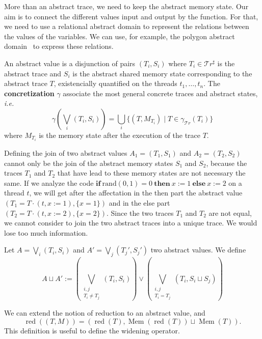 \documentclass[runningheads]{llncs}
\newcommand{\ifinst}{\mathbf{if}}
\newcommand{\theninst}{\mathbf{then}}
\newcommand{\elseinst}{\mathbf{else}}
\newcommand{\Traces}{\mathcal T\!r}
\newcommand{\aTraces}{\mathcal T\!r^\sharp}
\DeclareMathOperator{\red}{red}
\DeclareMathOperator{\Mem}{Mem}
\begin{document}
More than an abstract trace, we need to keep the abstract memory state. Our aim is to connect the different values input and output by the function. For that, we need to use a relational abstract domain to represent the relations between the values of the variables. We can use, for example, the polygon abstract domain~\cite{DBLP:journals/lisp/Mine06} to express these relations. 



\begin{definition}
	An abstract value is a disjunction of pairs $(T_i, S_i)$ where $T_i \in \aTraces$ is the abstract trace and $S_i$ is the abstract shared memory state corresponding to the abstract trace $T$, existencially quantified on the threads $t_1, \dots, t_n$. The \textbf{concretization} $\gamma$ associate the most general concrete traces and abstract states, \emph{i.e.}
	\[\gamma\left(\bigvee_i (T_i, S_i)\right) = \bigcup_i \{ (T, M_{T_i}) \mid T\in\gamma_{\Traces}(T_i) \}\]
	where $M_{T_i}$ is the memory state after the execution of the trace $T$. 
\end{definition}





Defining the join of two abstract values $A_1 = (T_1, S_1)$ and $A_2 = (T_2, S_2)$ cannot only be the join of the abstract memory states $S_1$ and $S_2$, because the traces $T_1$ and $T_2$ that have lead to these memory states are not necessary the same. If we analyze the code $\ifinst\ \mathrm{rand}(0,1) = 0\ \theninst \ x := 1 \ \elseinst \ x :=2$ on a thread $t$, we will get after the affectation in the then part the abstract value $(T_1 = T \cdot (t, x:=1), \{x = 1\})$ and in the else part $(T_2 = T \cdot (t, x:= 2), \{x = 2\})$. Since the two traces $T_1$ and $T_2$ are not equal, we cannot consider to join the two abstract traces into a unique trace. We would lose too much information. 


\begin{definition}[Join]
	Let $A = \bigvee_i (T_i, S_i)$ and $A' = \bigvee_j (T_j', S_j')$ two abstract values. We define
	\[A \sqcup A' := \left(\bigvee_{\substack{i,j\\T_i \neq T_j}} (T_i, S_i) \right) \vee \left(\bigvee_{\substack{i,j \\ T_i = T_j}} (T_i, S_i \sqcup S_j) \right)\]
\end{definition}



We can extend the notion of reduction to an abstract value, and \[\red((T, M)) = (\red(T), \Mem(\red(T)) \sqcup \Mem(T)).\] 
This definition is useful to define the widening operator. 
\end{document}
